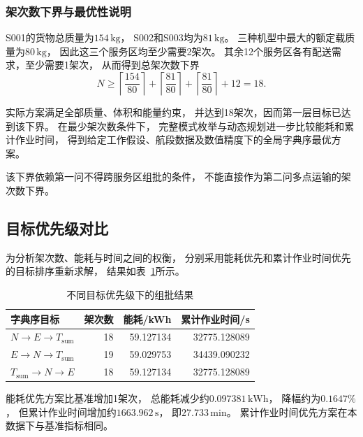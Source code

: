 \documentclass[bwprint]{gmcmthesis}
\begin{document}
\subsubsection{架次数下界与最优性说明}

S001的货物总质量为$154\,\mathrm{kg}$，
S002和S003均为$81\,\mathrm{kg}$。
三种机型中最大的额定载质量为$80\,\mathrm{kg}$，
因此这三个服务区均至少需要2架次。
其余12个服务区各有配送需求，至少需要1架次，
从而得到总架次数下界
\begin{equation}
    N
    \geq
    \left\lceil\frac{154}{80}\right\rceil
    +
    \left\lceil\frac{81}{80}\right\rceil
    +
    \left\lceil\frac{81}{80}\right\rceil
    +12
    =18.
\end{equation}

实际方案满足全部质量、体积和能量约束，
并达到18架次，因而第一层目标已达到该下界。
在最少架次数条件下，
完整模式枚举与动态规划进一步比较能耗和累计作业时间，
得到给定工作假设、航段数据及数值精度下的全局字典序最优方案。

该下界依赖第一问不得跨服务区组批的条件，
不能直接作为第二问多点运输的架次数下界。

\subsection{目标优先级对比}

为分析架次数、能耗与时间之间的权衡，
分别采用能耗优先和累计作业时间优先的目标排序重新求解，
结果如表~\ref{tab:q1_priority}所示。

\begin{table}[htbp]
    \centering
    \caption{不同目标优先级下的组批结果}
    \label{tab:q1_priority}
    \begin{tabular}{lrrr}
        \toprule
        字典序目标 & 架次数 & 能耗/kWh & 累计作业时间/s \\
        \midrule
        $N\rightarrow E\rightarrow T_{\mathrm{sum}}$
        &18&59.127134&32775.128089\\
        $E\rightarrow N\rightarrow T_{\mathrm{sum}}$
        &19&59.029753&34439.090232\\
        $T_{\mathrm{sum}}\rightarrow N\rightarrow E$
        &18&59.127134&32775.128089\\
        \bottomrule
    \end{tabular}
\end{table}

能耗优先方案比基准增加1架次，
总能耗减少约$0.097381\,\mathrm{kWh}$，
降幅约为$0.1647\%$，
但累计作业时间增加约$1663.962\,\mathrm{s}$，
即$27.733\,\mathrm{min}$。
累计作业时间优先方案在本数据下与基准指标相同。
\end{document}
